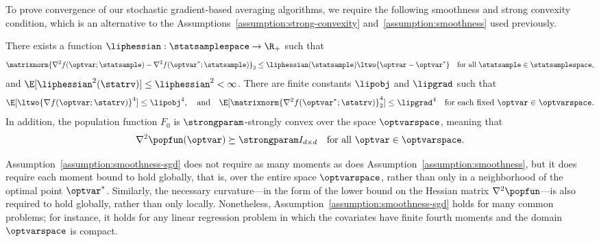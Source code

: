 \documentclass[11pt,twoside]{article}
\theoremstyle{definition}
\begin{document}
To prove convergence of our stochastic gradient-based averaging
algorithms, we require the following smoothness and strong convexity
condition, which is an alternative to the
Assumptions~\ref{assumption:strong-convexity}
and~\ref{assumption:smoothness} used previously.
%
\begin{assumption}
  \label{assumption:smoothness-sgd}
  There exists a function $\liphessian : \statsamplespace \rightarrow
  \R_+$ such that
  \begin{equation*}
    \matrixnorm{\nabla^2 f(\optvar; \statsample) - \nabla^2
      f(\optvar^*; \statsample)}_2 \le \liphessian(\statsample)
    \ltwo{\optvar - \optvar^*}
    ~~~ \mbox{for~all}~\statsample \in \statsamplespace,
  \end{equation*}
  and $\E[\liphessian^2(\statrv)] \le \liphessian^2 < \infty$.
  There are finite constants $\lipobj$ and $\lipgrad$ such
  that
  \begin{equation*}
    \E[\ltwo{\nabla f(\optvar; \statrv)}^4] \le \lipobj^4, \quad
    \mbox{and} \quad \E[\matrixnorm{\nabla^2 f(\optvar^*; \statrv)}_2^4]
    \le \lipgrad^4 \quad \mbox{for each fixed} ~ \optvar \in \optvarspace.
  \end{equation*}
  In addition, the population function $F_0$ is $\strongparam$-strongly
  convex over the space $\optvarspace$, meaning that
  \begin{align}
    \nabla^2 \popfun(\optvar) \succeq \strongparam I_{d \times d} \quad
    \mbox{for all} ~ \optvar \in \optvarspace.
  \end{align}
\end{assumption}
\noindent
Assumption~\ref{assumption:smoothness-sgd} does not require as many
moments as does Assumption~\ref{assumption:smoothness}, but it does
require each moment bound to hold globally, that is, over the entire
space $\optvarspace$, rather than only in a neighborhood of the
optimal point $\optvar^*$. Similarly, the necessary curvature---in the
form of the lower bound on the Hessian matrix $\nabla^2 \popfun$---is
also required to hold globally, rather than only locally. Nonetheless,
Assumption~\ref{assumption:smoothness-sgd} holds for many common
problems; for instance, it holds for any linear regression problem in
which the covariates have finite fourth moments and the domain
$\optvarspace$ is compact. \\
\end{document}
